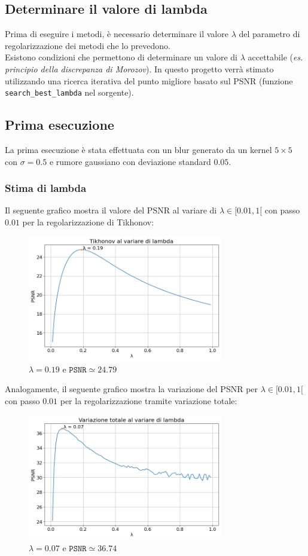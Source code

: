 \documentclass[11pt]{article}
\begin{document}
\subsection{Determinare il valore di lambda}
Prima di eseguire i metodi, è necessario determinare il valore $\lambda$ del parametro di regolarizzazione dei metodi che lo prevedono.\\
Esistono condizioni che permettono di determinare un valore di $\lambda$ accettabile (\textit{es. principio della discrepanza di Morozov}). In questo progetto verrà stimato utilizzando una ricerca iterativa del punto migliore basato sul PSNR (funzione \texttt{search\_best\_lambda} nel sorgente).

\subsection{Prima esecuzione}
La prima esecuzione è stata effettuata con un blur generato da un kernel $5 \times 5$ con $\sigma=0.5$ e rumore gaussiano con deviazione standard $0.05$.

\subsubsection{Stima di lambda}
Il seguente grafico mostra il valore del PSNR al variare di $\lambda \in [0.01, 1[$ con passo $0.01$ per la regolarizzazione di Tikhonov:
\begin{figure}[H]
    \centering
    \includegraphics[width=8.5cm]{esecuzione/1/tikhonov_lambda.png}
    \caption{$\lambda=0.19$ e $\texttt{PSNR} \simeq 24.79$}
    \label{fig:tikhonov_lambda1}
\end{figure}
Analogamente, il seguente grafico mostra la variazione del PSNR per $\lambda \in [0.01, 1[$ con passo $0.01$ per la regolarizzazione tramite variazione totale:
\begin{figure}[H]
    \centering
    \includegraphics[width=8.5cm]{esecuzione/1/tv_lambda.png}
    \caption{$\lambda=0.07$ e $\texttt{PSNR} \simeq 36.74$}
    \label{fig:tv_lambda1}
\end{figure}	
\end{document}
